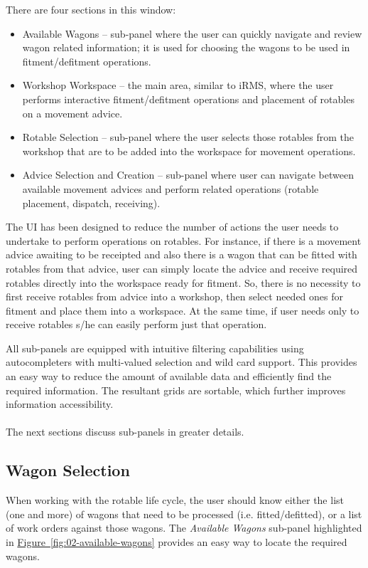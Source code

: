 There are four sections in this window:
\begin{itemize}
	\item Available Wagons -- sub-panel where the user can quickly navigate and review wagon related information; it is used for choosing the wagons to be used in fitment/defitment operations.
	\item Workshop Workspace -- the main area, similar to iRMS, where the user performs interactive fitment/defitment operations and placement of rotables on a movement advice.
	\item Rotable Selection -- sub-panel where the user selects those rotables from the workshop that are to be added into the workspace for movement operations.
	\item Advice Selection and Creation -- sub-panel where user can navigate between available movement advices and perform related operations (rotable placement, dispatch, receiving).
\end{itemize}
The UI has been designed to reduce the number of actions the user needs to undertake to perform operations on rotables. For instance, if there is a movement advice awaiting to be receipted and also there is a wagon that can be fitted with rotables from that advice, user can simply locate the advice and receive required rotables directly into the workspace ready for fitment. So, there is no necessity to first receive rotables from advice into a workshop, then select needed ones for fitment and place them into a workspace. At the same time, if user needs only to receive rotables s/he can easily perform just that operation.

All sub-panels are equipped with intuitive filtering capabilities using autocompleters with multi-valued selection and wild card support. This provides an easy way to reduce the amount of available data and efficiently find the required information. The resultant grids are sortable, which further improves information accessibility.
\\\\
The next sections discuss sub-panels in greater details.
\clearpage

\subsection{Wagon Selection}
When working with the rotable life cycle, the user should know either the list (one and more) of wagons that need to be processed (i.e. fitted/defitted), or a list of work orders against those wagons. The \emph{Available Wagons} sub-panel highlighted in \hyperref[fig:02-available-wagons]{Figure~\ref*{fig:02-available-wagons}} provides an easy way to locate the required wagons.

